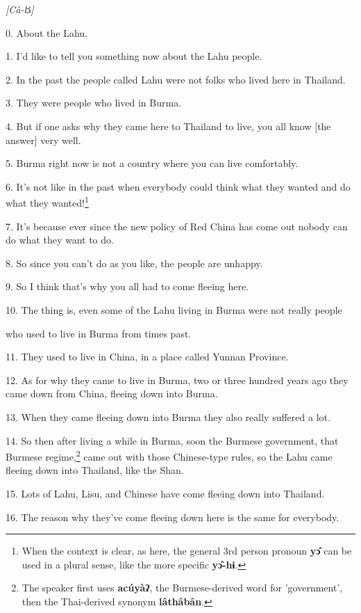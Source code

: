 \setcounter{footnote}{0}

\textit{[Cà-l}ɔ\textit{̂]}

0. About the Lahu.

1. I'd like to tell you something now about the Lahu people.

2. In the past the people called Lahu were not folks who lived here in Thailand.

3. They were people who lived in Burma.

4. But if one asks why they came here to Thailand to live, you all know [the answer]
very well.

5. Burma right now is not a country where you can live comfortably.

6. It's not like in the past when everybody could think what they wanted and do
what they wanted!\footnote{When the context is clear, as here, the general 3rd person pronoun \textbf{yɔ̂} can be used in a plural sense, like the more specific \textbf{yɔ̂-hɨ}.}

7. It's because ever since the new policy of Red China has come out nobody can
do what they want to do.

8. So since you can't do as you like, the people are unhappy.

9. So I think that's why you all had to come fleeing here.

10. The thing is, even some of the Lahu living in Burma were not really people

who used to live in Burma from times past.

11. They used to live in China, in a place called Yunnan Province.

12. As for why they came to live in Burma, two or three hundred years ago they
came down from China, fleeing down into Burma.

13. When they came fleeing down into Burma they also really suffered a lot.

14. So then after living a while in Burma, soon the Burmese government, that Burmese
regime,\footnote{The speaker first uses \textbf{acúyàʔ}, the Burmese-derived word for 'government', then the Thai-derived synonym \textbf{lâthâbân}.} came out with those Chinese-type rules, so the Lahu came fleeing down
into Thailand, like the Shan.

15. Lots of Lahu, Lisu, and Chinese have come fleeing down into Thailand.

16. The reason why they've come fleeing down here is the same for everybody.

